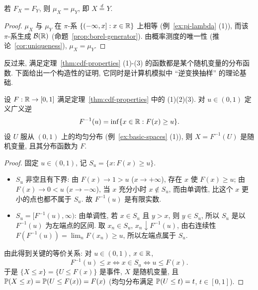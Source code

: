 \begin{theorem}[分布函数决定分布]\label{thm:cdf-determines}
若 $F_X=F_Y$, 则 $\mu_X=\mu_Y$, 即 $X\overset{d}{=}Y$.
\end{theorem}

\begin{proof}
$\mu_X$ 与 $\mu_Y$ 在 $\pi$-系 $\{(-\infty,x]: x\in\R\}$ 上相等 (例~\ref{ex:pi-lambda} (1)), 而该 $\pi$-系生成 $\mathcal{B}(\R)$ (命题~\ref{prop:borel-generator}). 由概率测度的唯一性 (推论~\ref{cor:uniqueness}), $\mu_X=\mu_Y$.
\end{proof}

反过来, 满足定理~\ref{thm:cdf-properties} (1)-(3) 的函数都是某个随机变量的分布函数. 下面给出一个构造性的证明, 它同时是计算机模拟中 ``逆变换抽样'' 的理论基础.

\begin{theorem}[分位数变换]\label{thm:quantile}
设 $F:\R\to[0,1]$ 满足定理~\ref{thm:cdf-properties} 中的 (1)(2)(3). 对 $u\in(0,1)$ 定义广义逆
\[
F^{-1}(u)=\inf\{x\in\R: F(x)\ge u\}.
\]
设 $U$ 服从 $(0,1)$ 上的均匀分布 (例~\ref{ex:basic-spaces} (1)), 则 $X=F^{-1}(U)$ 是随机变量, 且其分布函数为 $F$.
\end{theorem}

\begin{proof}
固定 $u\in(0,1)$, 记 $S_u=\{x: F(x)\ge u\}$.
\begin{itemize}
\item $S_u$ 非空且有下界: 由 $F(x)\to1>u$ ($x\to+\infty$), 存在 $x$ 使 $F(x)\ge u$; 由 $F(x)\to0<u$ ($x\to-\infty$), 当 $x$ 充分小时 $x\notin S_u$, 而由单调性, 比这个 $x$ 更小的点也都不属于 $S_u$. 故 $F^{-1}(u)$ 是有限实数.
\item $S_u=[F^{-1}(u),\infty)$: 由单调性, 若 $x\in S_u$ 且 $y>x$, 则 $y\in S_u$, 所以 $S_u$ 是以 $F^{-1}(u)$ 为左端点的区间. 取 $x_n\in S_u$, $x_n\downarrow F^{-1}(u)$, 由右连续性 $F(F^{-1}(u))=\lim_n F(x_n)\ge u$, 所以左端点属于 $S_u$.
\end{itemize}
由此得到关键的等价关系: 对 $u\in(0,1)$, $x\in\R$,
\begin{equation}\label{eq:galois}
F^{-1}(u)\le x\iff x\in S_u\iff u\le F(x).
\end{equation}
于是 $\{X\le x\}=\{U\le F(x)\}$ 是事件, $X$ 是随机变量, 且
$\P(X\le x)=\P(U\le F(x))=F(x)$ (均匀分布满足 $\P(U\le t)=t$, $t\in[0,1]$).
\end{proof}


